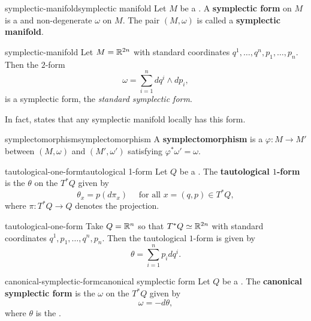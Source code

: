 \begin{topic}{symplectic-manifold}{symplectic manifold}
    Let $M$ be a . A \textbf{symplectic form} on $M$ is a  and non-degenerate  $\omega$ on $M$. The pair $(M, \omega)$ is called a \textbf{symplectic manifold}.
\end{topic}

\begin{example}{symplectic-manifold}
    Let $M = \mathbb{R}^{2n}$ with standard coordinates $q^1, \ldots, q^n, p_1, \ldots, p_n$. Then the $2$-form
    \[ \omega = \sum_{i = 1}^{n} d q^i \wedge d p_i , \]
    is a symplectic form, the \textit{standard symplectic form}.
    
    In fact,  states that any symplectic manifold locally has this form.
\end{example}

\begin{topic}{symplectomorphism}{symplectomorphism}
    A \textbf{symplectomorphism} is a  $\varphi : M \to M'$ between  $(M, \omega)$ and $(M', \omega')$ satisfying $\varphi^* \omega' = \omega$.
\end{topic}

\begin{topic}{tautological-one-form}{tautological 1-form}
    Let $Q$ be a . The \textbf{tautological $1$-form} is the  $\theta$ on the  $T^*Q$ given by
    \[ \theta_x = p(d \pi_x) \quad \text{ for all } x = (q, p) \in T^*Q , \]
    where $\pi : T^*Q \to Q$ denotes the projection.
\end{topic}

\begin{example}{tautological-one-form}
    Take $Q = \mathbb{R}^n$ so that $T^* Q \simeq \mathbb{R}^{2n}$ with standard coordinates $q^1, p_1, \ldots, q^n, p_n$. Then the tautological $1$-form is given by
    \[ \theta = \sum_{i = 1}^{n} p_i dq^i . \]
\end{example}

\begin{topic}{canonical-symplectic-form}{canonical symplectic form}
    Let $Q$ be a . The \textbf{canonical symplectic form} is the  $\omega$ on the  $T^* Q$ given by
    \[ \omega = -d \theta , \]
    where $\theta$ is the .
\end{topic}

